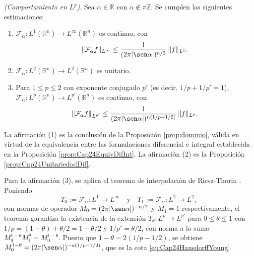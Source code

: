             \begin{proposition}\label{prop:Cap24LpDif}
                \textit{(Comportamiento en $L^p$).} Sea $\alpha \in \mathbb{R}$ con $\alpha \notin \pi\mathbb{Z}$. Se cumplen las siguientes estimaciones:
                \begin{enumerate}
                    \item $\mathcal{F}_\alpha: L^1(\mathbb{R}^n) \to L^\infty(\mathbb{R}^n)$ es continuo, con
                    \begin{equation*}
                        \|\mathcal{F}_\alpha f\|_{L^\infty} \leq \frac{1}{(2\pi|\sen\alpha|)^{n/2}}\,\|f\|_{L^1}.
                    \end{equation*}
                    \item $\mathcal{F}_\alpha: L^2(\mathbb{R}^n) \to L^2(\mathbb{R}^n)$ es unitario.
                    \item Para $1\leq p \leq 2$ con exponente conjugado $p'$ (es decir, $1/p + 1/p' = 1$), $\mathcal{F}_\alpha: L^p(\mathbb{R}^n) \to L^{p'}(\mathbb{R}^n)$ es continuo, con
                    \begin{equation}\label{eq:Cap24HausdorffYoung}
                        \|\mathcal{F}_\alpha f\|_{L^{p'}} \leq \frac{1}{(2\pi|\sen\alpha|)^{n(1/p - 1/2)}}\,\|f\|_{L^p}.
                    \end{equation}
                \end{enumerate}
            \end{proposition}
            \begin{Proof}
                La afirmación (1) es la conclusión de la Proposición \ref{prop:dominio}, válida en virtud de la equivalencia entre las formulaciones diferencial e integral establecida en la Proposición \ref{prop:Cap24EquivDifInt}. La afirmación (2) es la Proposición \ref{prop:Cap24UnitariedadDif}.

                Para la afirmación (3), se aplica el teorema de interpolación de Riesz-Thorin \citep[Thm. 1.3]{grafakos2014classical}. Poniendo
                \begin{equation*}
                    T_0 := \mathcal{F}_\alpha: L^1 \to L^\infty\quad\text{y}\quad T_1 := \mathcal{F}_\alpha: L^2 \to L^2,
                \end{equation*}
                con normas de operador $M_0 = (2\pi|\sen\alpha|)^{-n/2}$ y $M_1 = 1$ respectivamente, el teorema garantiza la existencia de la extensión $T_\theta: L^{p} \to L^{p'}$ para $0\leq \theta \leq 1$ con $1/p = (1-\theta) + \theta/2 = 1 - \theta/2$ y $1/p' = \theta/2$, con norma a lo sumo $M_0^{1-\theta}M_1^{\theta} = M_0^{1-\theta}$. Puesto que $1-\theta = 2(1/p - 1/2)$, se obtiene $M_0^{1-\theta} = (2\pi|\sen\alpha|)^{-n(1/p-1/2)}$, que es la cota \eqref{eq:Cap24HausdorffYoung}.
            \end{Proof}

